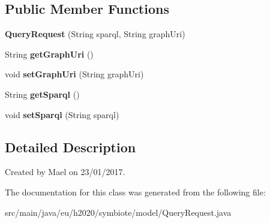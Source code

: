 \subsection*{Public Member Functions}
\begin{DoxyCompactItemize}
\item 
{\bfseries Query\+Request} (String sparql, String graph\+Uri)\hypertarget{classeu_1_1h2020_1_1symbiote_1_1model_1_1QueryRequest_aceafa1a43808d053112665e422b10e8a}{}\label{classeu_1_1h2020_1_1symbiote_1_1model_1_1QueryRequest_aceafa1a43808d053112665e422b10e8a}

\item 
String {\bfseries get\+Graph\+Uri} ()\hypertarget{classeu_1_1h2020_1_1symbiote_1_1model_1_1QueryRequest_aebc84bcc3c9706d6f8856a02f974834c}{}\label{classeu_1_1h2020_1_1symbiote_1_1model_1_1QueryRequest_aebc84bcc3c9706d6f8856a02f974834c}

\item 
void {\bfseries set\+Graph\+Uri} (String graph\+Uri)\hypertarget{classeu_1_1h2020_1_1symbiote_1_1model_1_1QueryRequest_add4593940902dfbd1342ab57a771a353}{}\label{classeu_1_1h2020_1_1symbiote_1_1model_1_1QueryRequest_add4593940902dfbd1342ab57a771a353}

\item 
String {\bfseries get\+Sparql} ()\hypertarget{classeu_1_1h2020_1_1symbiote_1_1model_1_1QueryRequest_a4b337bbff009caa70dcd668035fa1f91}{}\label{classeu_1_1h2020_1_1symbiote_1_1model_1_1QueryRequest_a4b337bbff009caa70dcd668035fa1f91}

\item 
void {\bfseries set\+Sparql} (String sparql)\hypertarget{classeu_1_1h2020_1_1symbiote_1_1model_1_1QueryRequest_a7548ea81d796ca6ed03af66a7bd059fe}{}\label{classeu_1_1h2020_1_1symbiote_1_1model_1_1QueryRequest_a7548ea81d796ca6ed03af66a7bd059fe}

\end{DoxyCompactItemize}


\subsection{Detailed Description}
Created by Mael on 23/01/2017. 

The documentation for this class was generated from the following file\+:\begin{DoxyCompactItemize}
\item 
src/main/java/eu/h2020/symbiote/model/Query\+Request.\+java\end{DoxyCompactItemize}
